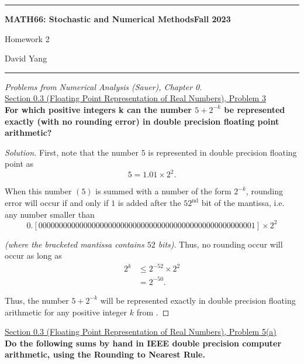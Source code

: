 \documentclass[11pt]{article}
\newenvironment{solution}
  {\renewcommand\qedsymbol{$\blacksquare$}\begin{proof}[Solution]}
  {\end{proof}}
\theoremstyle{definition}
\begin{document}
	\hrule
	\begin{center}
        \textbf{MATH66: Stochastic and Numerical Methods}\hfill \textbf{Fall 2023}\newline

		{\Large Homework 2}

		David Yang
	\end{center}

\hrule

\vspace{1em}

\textit{Problems from Numerical Analysis (Sauer), Chapter 0.} \\

\underline{Section 0.3 (Floating Point Representation of Real Numbers), Problem 3} \\

\textbf{For which positive integers k can the number $5+2^{-k}$ be represented exactly (with no rounding error) in double precision floating point arithmetic?}
\begin{solution}First, note that the number $5$ is represented in double precision floating point as \[5 = 1.01 \times 2^2.\]

When this number $(5)$ is summed with a number of the form $2^{-k}$, rounding error will occur if and only if $1$ is added after the $52^{\text{nd}}$ bit of the mantissa, i.e. any number smaller than
\[ 0.[00000000000000000000000000000000000000000000000000001] \times 2^{2} \]

\textit{(where the bracketed mantissa contains $52$ bits)}. Thus, no rounding occur will occur as long as 
\begin{align*} 2^k &\leq 2^{-52} \times 2^{2} \\ &= 2^{-50}. \end{align*}

Thus, the number $5+2^{-k}$ will be represented exactly in double precision floating arithmetic for any positive integer $k$ from . \end{solution}

\newpage

\underline{Section 0.3 (Floating Point Representation of Real Numbers), Problem 5(a)} \\

\textbf{Do the following sums by hand in IEEE double precision computer arithmetic, using the Rounding to Nearest Rule.}
\end{document}
